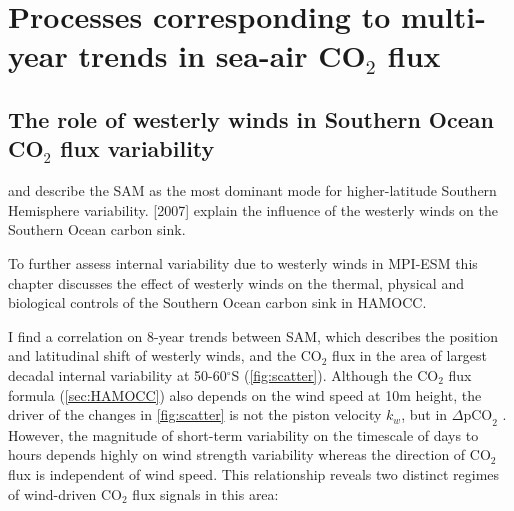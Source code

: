 \chapter{Processes corresponding to multi-year trends in sea-air CO$_2$ flux}
\label{ch:trends}

\section{The role of westerly winds in Southern Ocean CO$_2$ flux variability}

\cite{Thompson2000} and \cite{Hall2002} describe the \acf{SAM} as the most dominant mode for higher-latitude Southern Hemisphere variability. \citeauthor{Lovenduski2007} [{\color{RoyalBlue}2007}] explain the influence of the westerly winds on the Southern Ocean carbon sink. 

To further assess internal variability due to westerly winds in \acs{MPI}-\acs{ESM} this chapter discusses the effect of westerly winds on the thermal, physical and biological controls of the Southern Ocean carbon sink in \acs{HAMOCC}.\newline

I find a correlation on 8-year trends between \acs{SAM}, which describes the position and latitudinal shift of westerly winds, and the CO$_2$ flux in the area of largest decadal internal variability at 50-60$^\circ$S (\autoref{fig:scatter}). Although the CO$_2$ flux formula (\autoref{sec:HAMOCC}) also depends on the wind speed at 10m height, the driver of the changes in \autoref{fig:scatter} is not the piston velocity $k_w$, but in $\Delta \text{pCO}_2$ \citep{Lovenduski2015}. However, the magnitude of short-term variability on the timescale of days to hours depends highly on wind strength variability whereas the direction of CO$_2$ flux is independent of wind speed. This relationship reveals two distinct regimes of wind-driven CO$_2$ flux signals in this area: 

